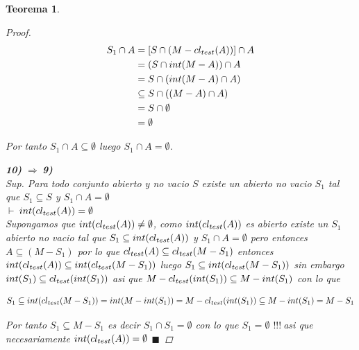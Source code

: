 \documentclass[oneside]{book} %
\theoremstyle{Teorema}
\newtheorem{Teorema}[Definicion]{Teorema}
\theoremstyle{Ejemplos}
\theoremstyle{[Obs]}
\def \test {test}
\newcommand{\cerradura}[2][\test]{\ifx \test #1 {\overline{#2}} \else {cl_{#1}(#2)} \fi} %
\renewcommand{\{}{\left\lbrace} %
\renewcommand{\}}{\right\rbrace} %
\newcommand{\n}{\cap} %
\renewcommand{\sc}{\subseteq} %
\renewcommand{\qed}{$\blacksquare$} %
\newcommand{\pd}{$\vdash\ $} %
\renewcommand{\c}{$!!!\ $} %
\newcommand{\Imp}{$\Rightarrow\ $} %
\begin{document}
\begin{Teorema}
\begin{proof}
					\begin{align*}
						S_1 \n A &= [S \n (M - \cerradura{A})] \n A \\ 
						&= (S \n int(M - A)) \n A \\ 
						&= S \n (int(M - A) \n A) \\ 
						&\sc S \n ((M - A) \n A) \\ 
						&= S \n \emptyset \\ 
						&= \emptyset
					\end{align*}

					Por tanto $S_1 \n A \sc \emptyset$ luego $S_1 \n A = \emptyset$.
	
					\textbf{10)} \Imp \textbf{9)} \\ 
					Sup. Para todo conjunto abierto y no vacio $S$ existe un abierto no vacio $S_1$ tal que $S_1 \sc S$ y $S_1 \n A = \emptyset$ \\ 
					\pd $int(\cerradura{A}) = \emptyset$ \\ 
					Supongamos que $int(\cerradura{A}) \neq \emptyset$, como $int(\cerradura{A})$ es abierto existe un $S_1$ abierto no vacio tal que $S_1 \sc int(\cerradura{A})$ y $S_1 \n A = \emptyset$ pero entonces $A \sc (M - S_1)$ por lo que $\cerradura{A} \sc \cerradura{M - S_1}$ entonces $int(\cerradura{A}) \sc int(\cerradura{M - S_1})$ luego $S_1 \sc int(\cerradura{M - S_1})$ sin embargo $int(S_1) \sc \cerradura{int(S_1)}$ asi que $M - \cerradura{int(S_1)} \sc M - int(S_1)$ con lo que

					\[ S_1 \sc int(\cerradura{M - S_1}) = int(M - int(S_1)) = M - \cerradura{int(S_1)} \sc M - int(S_1) = M - S_1 \]

					Por tanto $S_1 \sc M - S_1$ es decir $S_1 \n S_1 = \emptyset$ con lo que $S_1 = \emptyset$ \c asi que necesariamente $int(\cerradura{A}) = \emptyset$ \qed

				\end{proof}
			
			\end{Teorema}
\end{document}

